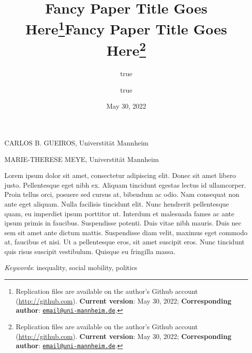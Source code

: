 \documentclass[
  11pt,
]{article}
\title{Fancy Paper Title Goes Here\thanks{Replication files are
available on the author's Github account (\url{http://github.com}).
\textbf{Current version}: May 30, 2022; \textbf{Corresponding author}:
\href{mailto:email@uni-mannheim.de}{\nolinkurl{email@uni-mannheim.de}}.}}
\author{true \and true}
\date{May 30, 2022}
\title{Fancy Paper Title Goes Here\thanks{Replication files are
available on the author's Github account (\url{http://github.com}).
\textbf{Current version}: May 30, 2022; \textbf{Corresponding author}:
\href{mailto:email@uni-mannheim.de}{\nolinkurl{email@uni-mannheim.de}}.}  }
\date{}
\renewenvironment{abstract}
 {{%
    \setlength{\leftmargin}{0mm}
    \setlength{\rightmargin}{\leftmargin}%
  }%
  \relax}
 {\endlist}
\begin{document}



{%
\setlength{\parindent}{0pt}
\thispagestyle{plain}
{%
\maketitle  %

}




{
   \vskip 13.5pt\relax \normalsize\fontsize{11}{12}
   \MakeUppercase{Carlos B. Gueiros}, \small{Universtität
Mannheim}   \par \vskip -3.5pt \MakeUppercase{Marie-Therese
Meye}, \small{Universtität Mannheim}   

}

}








\begin{abstract}


    \vskip 8.5pt %

\noindent \small{Lorem ipsum dolor sit amet, consectetur adipiscing
elit. Donec sit amet libero justo. Pellentesque eget nibh ex. Aliquam
tincidunt egestas lectus id ullamcorper. Proin tellus orci, posuere sed
cursus at, bibendum ac odio. Nam consequat non ante eget aliquam. Nulla
facilisis tincidunt elit. Nunc hendrerit pellentesque quam, eu imperdiet
ipsum porttitor ut. Interdum et malesuada fames ac ante ipsum primis in
faucibus. Suspendisse potenti. Duis vitae nibh mauris. Duis nec sem sit
amet ante dictum mattis. Suspendisse diam velit, maximus eget commodo
at, faucibus et nisi. Ut a pellentesque eros, sit amet suscipit eros.
Nunc tincidunt quis risus suscipit vestibulum. Quisque eu fringilla
massa.}


\vskip 8.5pt \noindent \emph{Keywords}: inequality, social mobility,
politics \par




\end{abstract}
\end{document}
